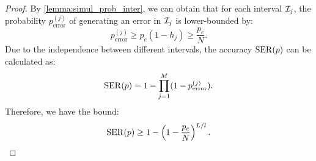 \begin{proof}
    By \cref{lemma:simul_prob_inter}, we can obtain that for each interval ${\mathcal{I}}_j$, the probability $p_\textrm{error}^{(j)}$ of generating an error in ${\mathcal{I}}_j$ is lower-bounded by:
    $$p_\textrm{error}^{(j)}\geq p_e(1-h_j)\geq\frac{p_e}{N}.$$
    Due to the independence between different intervals, the accuracy $\operatorname{SER}(p)$ can be calculated as:
    $$\operatorname{SER}(p)=1-\prod_{j=1}^{M}(1-p_\textrm{error}^{(j)}).$$
    Therefore, we have the bound:
    $$\operatorname{SER}(p)\geq 1-\left(1-\frac{p_e}{N}\right)^{L/l}.$$
\end{proof}



